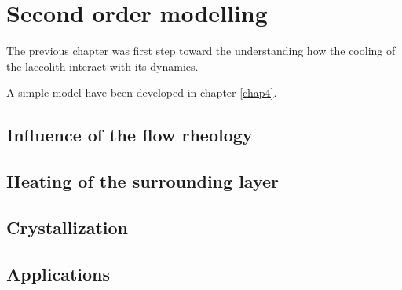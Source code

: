 \chapter{Second order modelling} 
\label{chap5} 
\minitoc

The previous chapter  was first step toward the  understanding how the
cooling of the laccolith interact with its dynamics. 

A simple model have been developed in chapter \ref{chap4}. 


\section{Influence of the flow rheology}
\label{sec:infl-flow-rheol}


\section{Heating of the surrounding layer}
\label{sec:heat-surr-layer}

\section{Crystallization}
\label{sec:crystallization}

\section{Applications}
\label{sec:applications}




